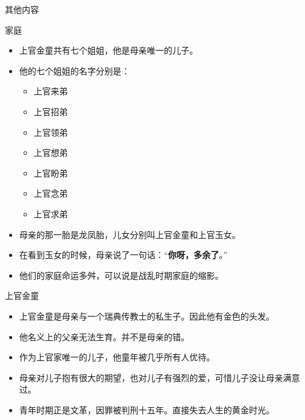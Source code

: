 \documentclass[utf-8]{beamer}
\begin{document}
    \begin{section}{其他内容}
        \begin{frame}{家庭}
            \pause
            \begin{itemize}
              \item 上官金童共有七个姐姐，他是母亲唯一的儿子。
              \pause
              \item 他的七个姐姐的名字分别是：
              \pause
              \begin{itemize}
                \item 上官来弟
                \item 上官招弟
                \item 上官领弟
                \item 上官想弟
                \item 上官盼弟
                \item 上官念弟
                \item 上官求弟
              \end{itemize}
              \pause
              \item 母亲的那一胎是龙凤胎，儿女分别叫上官金童和上官玉女。
              \pause
              \item 在看到玉女的时候，母亲说了一句话：“\textbf{你呀，多余了}。”%
              \pause
              \item 他们的家庭命运多舛，可以说是战乱时期家庭的缩影。
            \end{itemize}
        \end{frame}
        \begin{frame}{上官金童}%
            \pause
            \begin{itemize}
              \item 上官金童是母亲与一个瑞典传教士的私生子。因此他有金色的头发。%
              \pause
              \item 他名义上的父亲无法生育。并不是母亲的错。%
              \pause
              \item 作为上官家唯一的儿子，他童年被几乎所有人优待。%
              \pause
              \item 母亲对儿子抱有很大的期望，也对儿子有强烈的爱，可惜儿子没让母亲满意过。%
              \pause
              \item 青年时期正是文革，因罪被判刑十五年。直接失去人生的黄金时光。

\end{itemize}
\end{frame}
\end{section}
\end{document}
